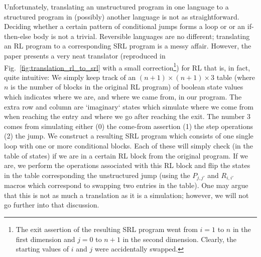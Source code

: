 Unfortunately, translating an unstructured program in one language to a structured program in (possibly) another language is not as straightforward. Deciding whether a certain pattern of conditional jumps forms a loop or or an if-then-else body is not a trivial. Reversible languages are no different; translating an RL program to a corresponding SRL program is a messy affair. However, the paper \cite[Fig.~22]{REV} presents a very neat translator (reproduced in Fig.~\ref{fig:translation_rl_to_srl} with a small correction\footnote{The exit assertion of the resulting SRL program went from $i=1$ to $n$ in the first dimension and $j=0$ to $n+1$ in the second dimension. Clearly, the starting values of $i$ and $j$ were accidentally swapped.}) for RL that is, in fact, quite intuitive: We simply keep track of an $(n+1) \times (n+1) \times 3$ table (where $n$ is the number of blocks in the original RL program) of boolean state values which indicates where we are, and where we came from, in our program. The extra row and column are `imaginary` states which simulate where we come from when reaching the entry and where we go after reaching the exit. The number $3$ comes from simulating either (0) the come-from assertion (1) the step operations (2) the jump. We construct a resulting SRL program which consists of one single loop with one or more conditional blocks. Each of these will simply check (in the table of states) if we are in a certain RL block from the original program. If we are, we perform the operations associated with this RL block and flip the states in the table corresponding the unstructured jump (using the $P_{j,j'}$ and $R_{i,i'}$ macros which correspond to swapping two entries in the table). One may argue that this is not as much a translation as it is a simulation; however, we will not go further into that discussion.
